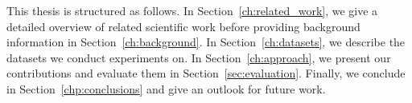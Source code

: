 This thesis is structured as follows. In Section~\ref{ch:related_work}, we give a detailed overview of related scientific work before providing background information in Section~\ref{ch:background}.
In Section~\ref{ch:datasets}, we describe the datasets we conduct experiments on.
In Section~\ref{ch:approach}, we present our contributions and evaluate them in Section~\ref{sec:evaluation}.
Finally, we conclude in Section~\ref{chp:conclusions} and give an outlook for future work.

